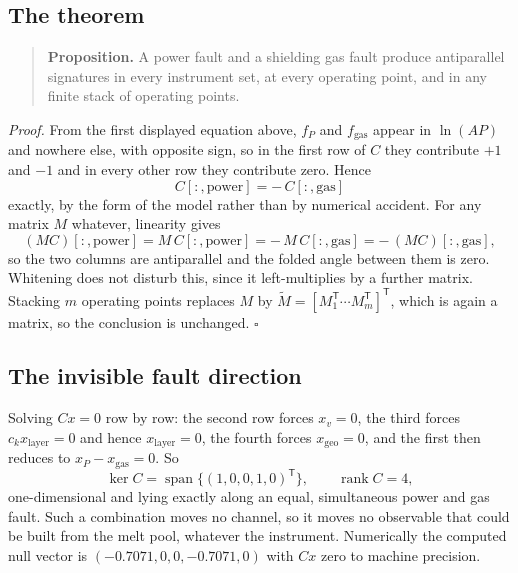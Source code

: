 \documentclass[preprint,12pt]{elsarticle}
\begin{document}
\subsection{The theorem}

\begin{quote}
\textbf{Proposition.} A power fault and a shielding gas fault produce
antiparallel signatures in every instrument set, at every operating point, and
in any finite stack of operating points.
\end{quote}

\noindent
\emph{Proof.} From the first displayed equation above, $f_P$ and
$f_{\mathrm{gas}}$ appear in $\ln(AP)$ and nowhere else, with opposite sign, so
in the first row of $C$ they contribute $+1$ and $-1$ and in every other row
they contribute zero. Hence
%
\begin{equation}
C[:,\mathrm{power}] = -\,C[:,\mathrm{gas}]
\label{eq:antipar}
\end{equation}
%
exactly, by the form of the model rather than by numerical accident. For any
matrix $M$ whatever, linearity gives
%
\begin{equation}
(MC)[:,\mathrm{power}] = M\,C[:,\mathrm{power}]
= -\,M\,C[:,\mathrm{gas}] = -\,(MC)[:,\mathrm{gas}] ,
\end{equation}
%
so the two columns are antiparallel and the folded angle between them is zero.
Whitening does not disturb this, since it left-multiplies by a further matrix.
Stacking $m$ operating points replaces $M$ by
$\tilde M = [M_1^{\mathsf T} \cdots M_m^{\mathsf T}]^{\mathsf T}$, which is
again a matrix, so the conclusion is unchanged. $\square$

\subsection{The invisible fault direction}

Solving $Cx = 0$ row by row: the second row forces $x_v = 0$, the third forces
$c_k x_{\mathrm{layer}} = 0$ and hence $x_{\mathrm{layer}} = 0$, the fourth
forces $x_{\mathrm{geo}} = 0$, and the first then reduces to
$x_P - x_{\mathrm{gas}} = 0$. So
%
\begin{equation}
\ker C = \operatorname{span}
\{ (1, 0, 0, 1, 0)^{\mathsf T} \} ,
\qquad \operatorname{rank} C = 4 ,
\end{equation}
%
one-dimensional and lying exactly along an equal, simultaneous power and gas
fault. Such a combination moves no channel, so it moves no observable that could
be built from the melt pool, whatever the instrument. Numerically the computed
null vector is $(-0.7071, 0, 0, -0.7071, 0)$ with $C x$ zero to machine
precision.
\end{document}
